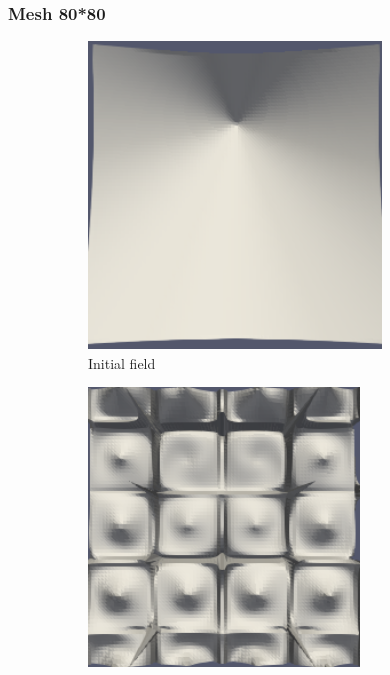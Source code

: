 \documentclass{article}
\begin{document}
\subsubsection{Mesh 80*80}
\begin{figure}[hbt!]
  \begin{subfigure}{0.4\textwidth}
        \centering
        \includegraphics[width=\textwidth]{Figures/e-4 80x80/for n 1.png}
        \caption{Initial field}
  \end{subfigure}
  \hfill
  \begin{subfigure}{0.4\textwidth}
        \centering
        \includegraphics[width=\textwidth]{Figures/e-4 80x80/for n 10.png}

\end{subfigure}
\end{figure}
\end{document}
